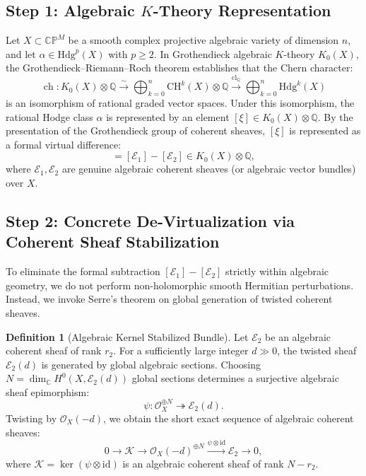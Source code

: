 \documentclass[11pt,reqno]{article}
\theoremstyle{definition}
\newtheorem{definition}[theorem]{Definition}
\DeclareMathOperator{\ch}{ch}
\newcommand{\Hdg}{\mathrm{Hdg}}
\begin{document}
\subsection{Step 1: Algebraic $K$-Theory Representation}
Let $X \subset \mathbb{CP}^M$ be a smooth complex projective algebraic variety of dimension $n$, and let $\alpha \in \Hdg^p(X)$ with $p \ge 2$. In Grothendieck algebraic $K$-theory $K_0(X)$, the Grothendieck--Riemann--Roch theorem establishes that the Chern character:
\begin{equation}
\ch : K_0(X) \otimes \mathbb{Q} \xrightarrow{\sim} \bigoplus_{k=0}^n \mathrm{CH}^k(X) \otimes \mathbb{Q} \xrightarrow{\mathrm{cl}_\mathbb{Q}} \bigoplus_{k=0}^n \Hdg^k(X)
\end{equation}
is an isomorphism of rational graded vector spaces. Under this isomorphism, the rational Hodge class $\alpha$ is represented by an element $[\xi] \in K_0(X) \otimes \mathbb{Q}$. By the presentation of the Grothendieck group of coherent sheaves, $[\xi]$ is represented as a formal virtual difference:
\begin{equation}
[\xi] = [\mathcal{E}_1] - [\mathcal{E}_2] \in K_0(X) \otimes \mathbb{Q},
\end{equation}
where $\mathcal{E}_1, \mathcal{E}_2$ are genuine algebraic coherent sheaves (or algebraic vector bundles) over $X$.

\subsection{Step 2: Concrete De-Virtualization via Coherent Sheaf Stabilization}
To eliminate the formal subtraction $[\mathcal{E}_1] - [\mathcal{E}_2]$ strictly within algebraic geometry, we do not perform non-holomorphic smooth Hermitian perturbations. Instead, we invoke Serre's theorem on global generation of twisted coherent sheaves.

\begin{definition}[Algebraic Kernel Stabilized Bundle]
Let $\mathcal{E}_2$ be an algebraic coherent sheaf of rank $r_2$. For a sufficiently large integer $d \gg 0$, the twisted sheaf $\mathcal{E}_2(d)$ is generated by global algebraic sections. Choosing $N = \dim_\mathbb{C} H^0(X, \mathcal{E}_2(d))$ global sections determines a surjective algebraic sheaf epimorphism:
\begin{equation}
\psi : \mathcal{O}_X^{\oplus N} \twoheadrightarrow \mathcal{E}_2(d).
\end{equation}
Twisting by $\mathcal{O}_X(-d)$, we obtain the short exact sequence of algebraic coherent sheaves:
\begin{equation}
0 \longrightarrow \mathcal{K} \longrightarrow \mathcal{O}_X(-d)^{\oplus N} \xrightarrow{\psi \otimes \mathrm{id}} \mathcal{E}_2 \longrightarrow 0,
\end{equation}
where $\mathcal{K} = \ker(\psi \otimes \mathrm{id})$ is an algebraic coherent sheaf of rank $N - r_2$.
\end{definition}
\end{document}
